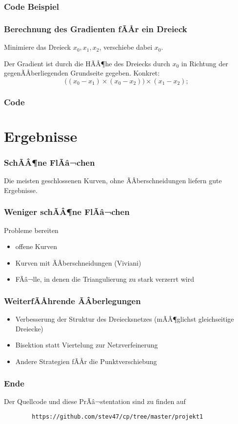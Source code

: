 \documentclass{beamer}
\begin{document}
\begin{frame}
	\frametitle{Code Beispiel}
	
\end{frame}

\begin{frame}
	\frametitle{Berechnung des Gradienten fÃÅr ein Dreieck}
	Minimiere das Dreieck $x_0,x_1,x_2$, verschiebe dabei $x_0$.

	Der Gradient ist durch die HÃÂ¶he des Dreiecks durch $x_0$ in Richtung der gegenÃÅberliegenden Grundseite gegeben.
	Konkret:
	\[
		\big((x_0 - x_1) \times (x_0 - x_2)\big) \times (x_1 - x_2);
	\]
\end{frame}

\begin{frame}
	\frametitle{Code}
	
\end{frame}


\section{Ergebnisse}

\begin{frame}
	\frametitle{SchÃÂ¶ne FlÃâ¬chen}
	Die meisten geschlossenen Kurven, ohne ÃÂberschneidungen liefern gute Ergebnisse.
\end{frame}

\begin{frame}
	\frametitle{Weniger schÃÂ¶ne FlÃâ¬chen}
	Probleme bereiten
	\begin{itemize}
		\item
			offene Kurven 
		\item
			Kurven mit ÃÂberschneidungen (Viviani)
		\item
			FÃâ¬lle, in denen die Triangulierung zu stark verzerrt wird
	\end{itemize}
\end{frame}

\begin{frame}
	\frametitle{WeiterfÃÅhrende ÃÂberlegungen}	
	\begin{itemize}
		\item
			Verbesserung der Struktur des Dreiecksnetzes (mÃÂ¶glichst gleichseitige Dreiecke)
		\item
			Bisektion statt Viertelung zur Netzverfeinerung
		\item
			Andere Strategien fÃÅr die Punktverschiebung
	\end{itemize}
\end{frame}

\begin{frame}[fragile]
	\frametitle{Ende}
	Der Quellcode und diese PrÃâ¬stentation sind zu finden auf
	\begin{verbatim}
		https://github.com/stev47/cp/tree/master/projekt1
	\end{verbatim}
\end{frame}
\end{document}
